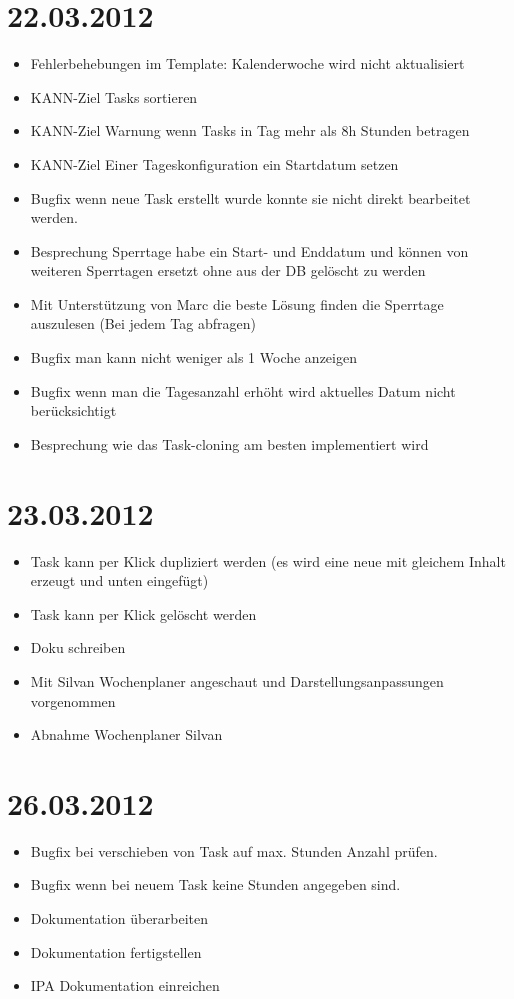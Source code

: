 \section{22.03.2012}
    \begin{itemize}
        \item Fehlerbehebungen im Template: Kalenderwoche wird nicht aktualisiert
        \item KANN-Ziel Tasks sortieren
        \item KANN-Ziel Warnung wenn Tasks in Tag mehr als 8h Stunden betragen
        \item KANN-Ziel Einer Tageskonfiguration ein Startdatum setzen
        \item Bugfix wenn neue Task erstellt wurde konnte sie nicht direkt bearbeitet werden.
        \item Besprechung Sperrtage habe ein Start- und Enddatum und können von weiteren Sperrtagen ersetzt ohne aus der DB gelöscht zu werden
        \item Mit Unterstützung von Marc die beste Lösung finden die Sperrtage auszulesen (Bei jedem Tag abfragen)
        \item Bugfix man kann nicht weniger als 1 Woche anzeigen
        \item Bugfix wenn man die Tagesanzahl erhöht wird aktuelles Datum nicht berücksichtigt
        \item Besprechung wie das Task-cloning am besten implementiert wird
    \end{itemize}
\section{23.03.2012}
    \begin{itemize}
        \item Task kann per Klick dupliziert werden (es wird eine neue mit gleichem Inhalt erzeugt und unten eingefügt)
        \item Task kann per Klick gelöscht werden
        \item Doku schreiben
        \item Mit Silvan Wochenplaner angeschaut und Darstellungsanpassungen vorgenommen
        \item Abnahme Wochenplaner Silvan
    \end{itemize}
\section{26.03.2012}
    \begin{itemize}
        \item Bugfix bei verschieben von Task auf max. Stunden Anzahl prüfen.
        \item Bugfix wenn bei neuem Task keine Stunden angegeben sind.
        \item Dokumentation überarbeiten
        \item Dokumentation fertigstellen
        \item IPA Dokumentation einreichen
    \end{itemize}
